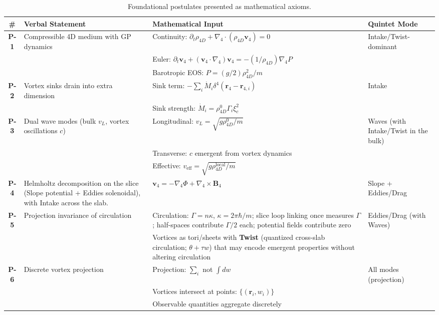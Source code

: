 \begin{table}[H]
\centering
\begin{tabularx}{\textwidth}{|c|Y|Y|Y|}
\hline
\# & Verbal Statement & Mathematical Input & Quintet Mode \\
\hline
\textbf{P-1} & Compressible 4D medium with GP dynamics & Continuity: $\partial_t \rho_{4D} + \nabla_4 \cdot (\rho_{4D} \mathbf{v}_4) = 0$ & Intake/Twist-dominant \\
& & Euler: $\partial_t \mathbf{v}_4 + (\mathbf{v}_4 \cdot \nabla_4) \mathbf{v}_4 = -(1/\rho_{4D}) \nabla_4 P$ &  \\
& & Barotropic EOS: $P = (g/2) \rho_{4D}^2 / m$ &  \\
\hline
\textbf{P-2} & Vortex sinks drain into extra dimension & Sink term: $-\sum_i \dot{M}_i \delta^4(\mathbf{r}_4 - \mathbf{r}_{4,i})$ & Intake \\
& & Sink strength: $\dot{M}_i = \rho_{4D}^0 \Gamma_i \xi_c^2$ &  \\
\hline
\textbf{P-3} & Dual wave modes (bulk $v_L$, vortex oscillations $c$) & Longitudinal: $v_L = \sqrt{g \rho_{4D}^0 / m}$ & Waves (with Intake/Twist in the bulk) \\
& & Transverse: $c$ emergent from vortex dynamics &  \\
& & Effective: $v_{\text{eff}} = \sqrt{g \rho_{4D}^{\text{local}} / m}$ &  \\
\hline
\textbf{P-4} & Helmholtz decomposition on the slice (Slope potential + Eddies solenoidal), with Intake across the slab. & $\mathbf{v}_4 = -\nabla_4 \Phi + \nabla_4 \times \mathbf{B}_4$ & Slope + Eddies/Drag \\
\hline
\textbf{P-5} & Projection invariance of circulation & Circulation: $\Gamma = n \kappa$, $\kappa = 2 \pi \hbar / m$; slice loop linking once measures $\Gamma$; half-spaces contribute $\Gamma/2$ each; potential fields contribute zero & Eddies/Drag (with Waves) \\
& & Vortices as tori/sheets with \textbf{Twist} (quantized cross-slab circulation; $\theta+\tau w$) that may encode emergent properties without altering circulation &  \\
\hline
\textbf{P-6} & Discrete vortex projection & Projection: $\sum_i$ not $\int dw$ & All modes (projection) \\
& & Vortices intersect at points: $\{(\mathbf{r}_i, w_i)\}$ &  \\
& & Observable quantities aggregate discretely &  \\
\hline
\end{tabularx}
\caption{Foundational postulates presented as mathematical axioms.}
\label{tab:postulates}
\end{table}

